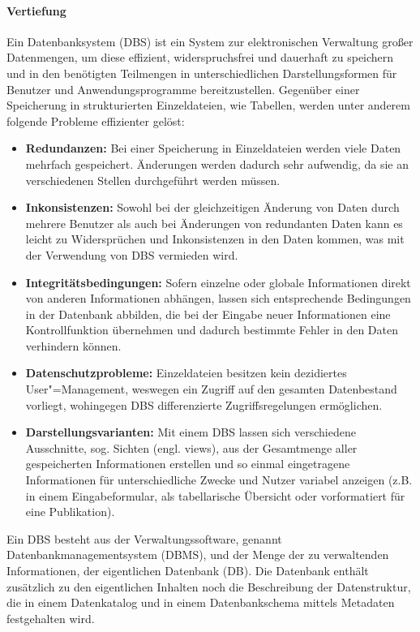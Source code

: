 \paragraph{Vertiefung}
Ein Datenbanksystem (DBS) ist ein System zur elektronischen Verwaltung großer Datenmengen, um diese effizient, widerspruchsfrei und dauerhaft zu speichern und in den benötigten Teilmengen in unterschiedlichen Darstellungsformen für Benutzer und Anwendungsprogramme bereitzustellen. Gegenüber einer Speicherung in strukturierten Einzeldateien, wie Tabellen, werden unter anderem folgende Probleme effizienter gelöst:

\begin{itemize}
	\item \textbf{Redundanzen:} Bei einer Speicherung in Einzeldateien werden viele Daten mehrfach gespeichert. Änderungen werden dadurch sehr aufwendig, da sie an verschiedenen Stellen durchgeführt werden müssen.
	\item \textbf{Inkonsistenzen:} Sowohl bei der gleichzeitigen Änderung von Daten durch mehrere Benutzer als auch bei Änderungen von redundanten Daten kann es leicht zu Widersprüchen und Inkonsistenzen in den Daten kommen, was mit der Verwendung von DBS vermieden wird.
	\item \textbf{Integritätsbedingungen:} Sofern einzelne oder globale Informationen direkt von anderen Informationen abhängen, lassen sich entsprechende Bedingungen in der Datenbank abbilden, die bei der Eingabe neuer Informationen eine Kontrollfunktion übernehmen und dadurch bestimmte Fehler in den Daten verhindern können.
	\item \textbf{Datenschutzprobleme:} Einzeldateien besitzen kein dezidiertes User"=Management, weswegen ein Zugriff auf den gesamten Datenbestand vorliegt, wohingegen DBS differenzierte Zugriffsregelungen ermöglichen.
	\item \textbf{Darstellungsvarianten:} Mit einem DBS lassen sich verschiedene Ausschnitte, sog. Sichten (engl. views), aus der Gesamtmenge aller gespeicherten Informationen erstellen und so einmal eingetragene Informationen für unterschiedliche Zwecke und Nutzer variabel anzeigen (z.B. in einem Eingabeformular, als tabellarische Übersicht oder vorformatiert für eine Publikation).
\end{itemize}

Ein DBS besteht aus der Verwaltungssoftware, genannt Datenbankmanagementsystem (DBMS), und der Menge der zu verwaltenden Informationen, der eigentlichen Datenbank (DB). Die Datenbank enthält zusätzlich zu den eigentlichen Inhalten noch die Beschreibung der Datenstruktur, die in einem Datenkatalog und in einem Datenbankschema mittels Metadaten festgehalten wird.

